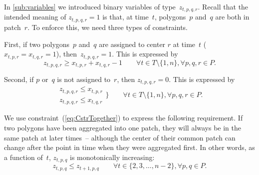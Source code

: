 
In \sect\ref{sub:variables} we introduced binary variables of 
type~$z_{t,p,q,r}$.
Recall that the intended meaning of $z_{t,p,q,r}=1$ is that, at
time~$t$, polygons~$p$ and~$q$ are both in patch~$r$.
To enforce this, we need three types of constraints.

First, if two polygons~$p$ and~$q$ are assigned 
to center $r$ at time~$t$ ($x_{t,p,r}=x_{t,q,r}=1$),
then~$z_{t,p,q,r}=1$.  This is expressed by
\begin{equation}
\label{eq:CstrZ1}
z_{t,p,q,r}\geq x_{t,p,r}+x_{t,q,r}-1 \qquad
\forall t \in T \setminus \{1,n\}, 
\forall p, q, r \in P.
\end{equation}

Second, if $p$ or~$q$ is not assigned to~$r$,
then $z_{t,p,q,r}=0$.  This is expressed by
\begin{equation}
\label{eq:CstrZ2}
\begin{array}{l}
z_{t,p,q,r} \le x_{t,p,r} \\
z_{t,p,q,r} \le x_{t,q,r}
\end{array} 
\bigg\} \qquad 
\forall t\in T \setminus \{1,n\}, 
\forall	p,q,r \in P.	
\end{equation}


We use constraint~(\ref{eq:CstrTogether}) 
to express the following requirement. 
If two polygons have been aggregated into one patch, 
they will always be in the same patch 
at later times~-- although the center of their common patch 
can change after the point in time 
when they were aggregated first. 
In other words, as a function of~$t$, 
$z_{t,p,q}$ is monotonically increasing:
\begin{equation}
\label{eq:CstrTogether}
z_{t,p,q} \le z_{t+1,p,q} \qquad
\forall t \in \{2,3,\ldots,n-2\},  
\forall p, q \in P.
\end{equation}

